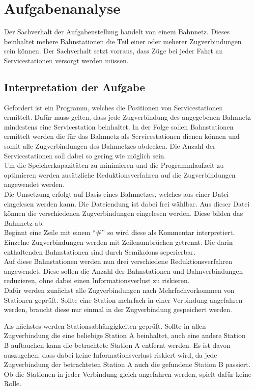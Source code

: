 \chapter{Aufgabenanalyse}\label{ch:aufgabenanalyse}
Der Sachverhalt der Aufgabenstellung handelt von einem Bahnnetz. Dieses beinhaltet mehere Bahnstationen die Teil einer oder meherer Zugverbindungen sein können. Der Sachverhalt setzt vorraus, dass Züge bei jeder Fahrt an Servicestationen versorgt werden müssen.
\section{Interpretation der Aufgabe}\label{sec:interpretation-der-aufgabe}
Gefordert ist ein Programm, welches die Positionen von Servicestationen ermittelt. Dafür muss gelten, dass jede Zugverbindung des angegebenen Bahnnetz mindestens eine Servicestation beinhaltet. In der Folge sollen Bahnstationen ermittelt werden die für das Bahnnetz als Servicestationen dienen können und somit alle Zugverbindungen des Bahnnetzes abdecken. Die Anzahl der Servicestationen soll dabei so gering wie möglich sein.
\\
Um die Speicherkapazitäten zu minimieren und die Programmlaufzeit zu optimieren werden zusätzliche Reduktionsverfahren auf die Zugverbindungen angewendet werden.\\ 

Die Umsetzung erfolgt auf Basis eines Bahnnetzes, welches aus einer Datei eingelesen werden kann. Die Dateiendung ist dabei frei wählbar. Aus dieser Datei können die verschiedenen Zugverbindungen eingelesen werden. Diese bilden das Bahnnetz ab.\\
Beginnt eine Zeile mit einem \enquote{\#} so wird diese als Kommentar interpretiert. Einzelne Zugverbindungen werden mit Zeilenumbrüchen getrennt. Die darin enthaltenden Bahnstationen sind durch Semikolons seperierbar.\\

Auf diese Bahnstationen werden nun drei verschiedene Reduktionsverfahren angewendet. Diese sollen die Anzahl der Bahnstationen und Bahnverbindungen reduzieren, ohne dabei einen Informationsverlust zu riskieren.\\ 

Dafür werden zunächst alle Zugverbindungen nach Mehrfachvorkommen von Stationen geprüft. Sollte eine Station mehrfach in einer Verbindung angefahren werden, braucht diese nur einmal in der Zugverbindung gespeichert werden.

Als nächstes werden Stationsabhängigkeiten geprüft. Sollte in allen Zugverbindung die eine beliebige Station A beinhaltet, auch eine andere Station B auftauchen kann die betrachtete Station A entfernt werden. Es ist davon auszugehen, dass dabei keine Informationsverlust riskiert wird, da jede Zugverbindung der betrachteten Station A auch die gefundene Station B passiert. Ob die Stationen in jeder Verbindung gleich angefahren werden, spielt dafür keine Rolle.

